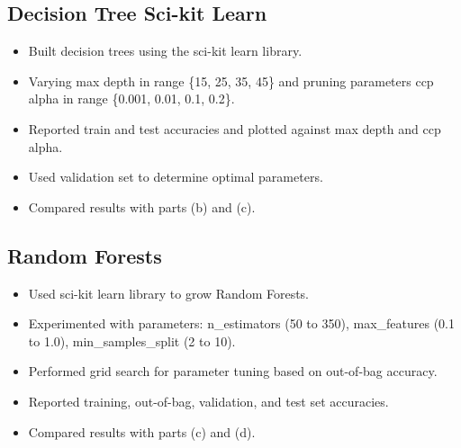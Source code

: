 \documentclass[12pt]{article}
\begin{document}
\subsection{Decision Tree Sci-kit Learn}
    \begin{itemize}
        \item Built decision trees using the sci-kit learn library.
        \item Varying max depth in range \{15, 25, 35, 45\} and pruning parameters ccp alpha in range \{0.001, 0.01, 0.1, 0.2\}.
        \item Reported train and test accuracies and plotted against max depth and ccp alpha.
        \item Used validation set to determine optimal parameters.
        \item Compared results with parts (b) and (c).
    \end{itemize}

\subsection{Random Forests}
    \begin{itemize}
        \item Used sci-kit learn library to grow Random Forests.
        \item Experimented with parameters: n\_estimators (50 to 350), max\_features (0.1 to 1.0), min\_samples\_split (2 to 10).
        \item Performed grid search for parameter tuning based on out-of-bag accuracy.
        \item Reported training, out-of-bag, validation, and test set accuracies.
        \item Compared results with parts (c) and (d).
    \end{itemize}
\end{document}
